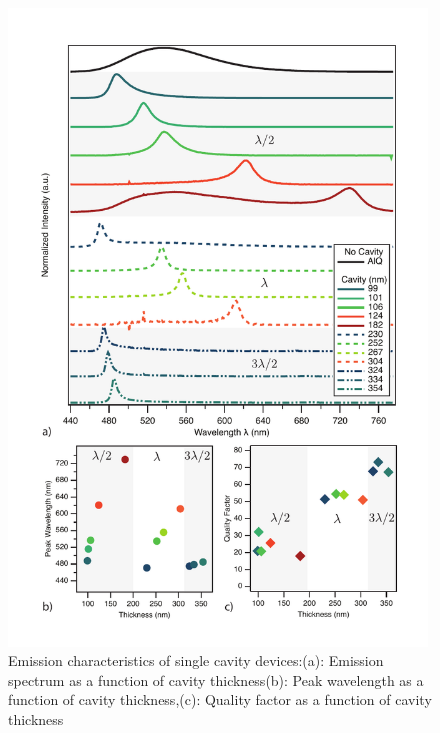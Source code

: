 \documentclass{report}
\begin{document}
        \begin{figure}
            \centering
            \vspace{-1cm}
            \includegraphics[width=0.99\textwidth]{images/n1_overview.pdf}
            \vspace{-1cm}
            \caption{Emission characteristics of single cavity devices:\newline (a): Emission spectrum as a function of cavity thickness\newline (b): Peak wavelength as a function of cavity thickness,\newline (c): Quality factor as a function of cavity thickness}
        \end{figure}

    
\end{document}
